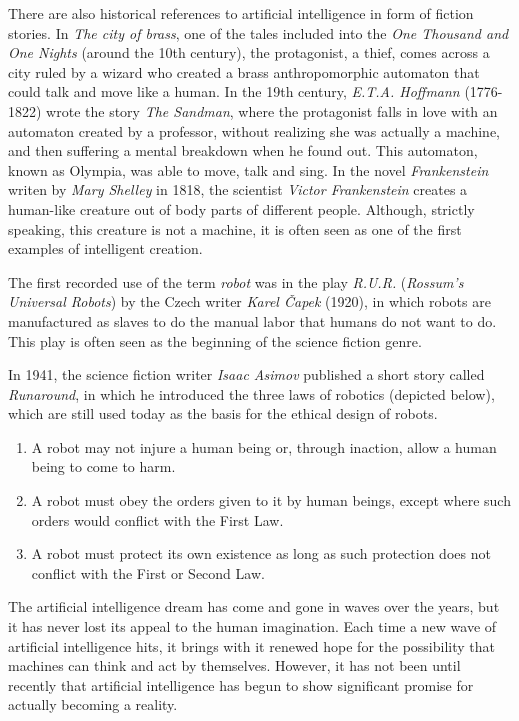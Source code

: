 There are also historical references to artificial intelligence in form of fiction stories. In \textit{The city of brass}, one of the tales included into the \textit{One Thousand and One Nights} (around the 10th century), the protagonist, a thief, comes across a city ruled by a wizard who created a brass anthropomorphic automaton that could talk and move like a human. In the 19th century, \textit{E.T.A. Hoffmann} (1776-1822) wrote the story \textit{The Sandman}, where the protagonist falls in love with an automaton created by a professor, without realizing she was actually a machine, and then suffering a mental breakdown when he found out. This automaton, known as Olympia, was able to move, talk and sing. In the novel \textit{Frankenstein} writen by \textit{Mary Shelley} in 1818, the scientist \textit{Victor Frankenstein} creates a human-like creature out of body parts of different people. Although, strictly speaking, this creature is not a machine, it is often seen as one of the first examples of intelligent creation.

The first recorded use of the term \textit{robot} was in the play \textit{R.U.R.} (\textit{Rossum’s Universal Robots}) by the Czech writer \textit{Karel Čapek} (1920), in which robots are manufactured as slaves to do the manual labor that humans do not want to do. This play is often seen as the beginning of the science fiction genre.

In 1941, the science fiction writer \textit{Isaac Asimov} published a short story called \textit{Runaround}, in which he introduced the three laws of robotics (depicted below), which are still used today as the basis for the ethical design of robots.


\begin{enumerate}

	\item A robot may not injure a human being or, through inaction, allow a human being to come to harm.

	\item A robot must obey the orders given to it by human beings, except where such orders would conflict with the First Law.

	\item A robot must protect its own existence as long as such protection does not conflict with the First or Second Law.

\end{enumerate}

The artificial intelligence dream has come and gone in waves over the years, but it has never lost its appeal to the human imagination. Each time a new wave of artificial intelligence hits, it brings with it renewed hope for the possibility that machines can think and act by themselves. However, it has not been until recently that artificial intelligence has begun to show significant promise for actually becoming a reality.

